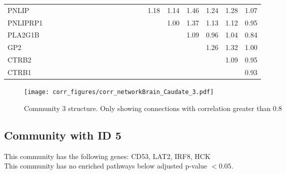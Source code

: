 \begin{longtable}{lrrrrrrrrrrrrrrrrrrrr}
PNLIP    &              &              &              &             &             &             &            &              &            &            &            &             &           &             &           1.18 &          1.14 &      1.46 &        1.24 &        1.28 &       1.07 \\
PNLIPRP1 &              &              &              &             &             &             &            &              &            &            &            &             &           &             &                &          1.00 &      1.37 &        1.13 &        1.12 &       0.95 \\
PLA2G1B  &              &              &              &             &             &             &            &              &            &            &            &             &           &             &                &               &      1.09 &        0.96 &        1.04 &       0.84 \\
GP2      &              &              &              &             &             &             &            &              &            &            &            &             &           &             &                &               &           &        1.26 &        1.32 &       1.00 \\
CTRB2    &              &              &              &             &             &             &            &              &            &            &            &             &           &             &                &               &           &             &        1.09 &       0.95 \\
CTRB1    &              &              &              &             &             &             &            &              &            &            &            &             &           &             &                &               &           &             &             &       0.93 \\
\end{longtable}


\begin{figure}[h!]
\centering
\texttt{[image: corr\_figures/corr\_networkBrain\_Caudate\_3.pdf]}
\caption{Community 3 structure. Only showing connections with correlation greater than 0.8}
\end{figure}




\subsection*{Community with ID 5}
This community has the following genes: CD53, LAT2, IRF8, HCK
\\
This community has no enriched pathways below adjusted p-value $< 0.05$.

